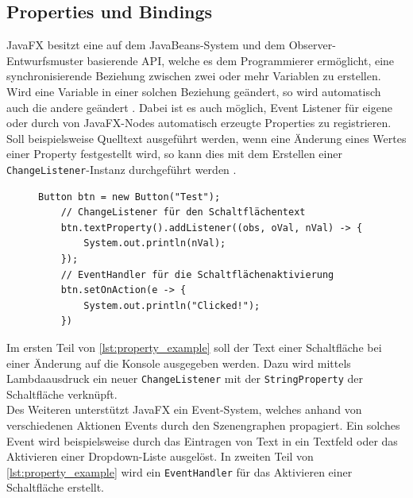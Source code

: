 \subsection{Properties und Bindings}
\label{properties_und_bindings}
JavaFX besitzt eine auf dem JavaBeans-System und dem Observer-Entwurfsmuster basierende API, welche es dem Programmierer ermöglicht, eine synchronisierende Beziehung zwischen zwei oder mehr Variablen zu erstellen. Wird eine Variable in einer solchen Beziehung geändert, so wird automatisch auch die andere geändert \cite{Hommel2013}. Dabei ist es auch möglich, Event Listener für eigene oder durch von JavaFX-Nodes automatisch erzeugte Properties zu registrieren. Soll beispielsweise Quelltext ausgeführt werden, wenn eine Änderung eines Wertes einer Property festgestellt wird, so kann dies mit dem Erstellen einer \texttt{ChangeListener}-Instanz durchgeführt werden \cite{Gao2019}. 
\begin{figure}
	\begin{lstlisting}[caption=Beispiel -- ChangeListener \& EventHandler, captionpos=b, label=lst:property_example]
	Button btn = new Button("Test");
	// ChangeListener für den Schaltflächentext
	btn.textProperty().addListener((obs, oVal, nVal) -> {
		System.out.println(nVal);
	});	
	// EventHandler für die Schaltflächenaktivierung
	btn.setOnAction(e -> {
		System.out.println("Clicked!");
	})
	\end{lstlisting}
\end{figure}
\noindent Im ersten Teil von \autoref{lst:property_example} soll der Text einer Schaltfläche bei einer Änderung auf die Konsole ausgegeben werden. Dazu wird mittels Lambdaausdruck ein neuer \texttt{ChangeListener} mit der \texttt{StringProperty} der Schaltfläche verknüpft.\\
Des Weiteren unterstützt JavaFX ein Event-System, welches anhand von verschiedenen Aktionen Events durch den Szenengraphen propagiert. Ein solches Event wird beispielsweise durch das Eintragen von Text in ein Textfeld oder das Aktivieren einer Dropdown-Liste ausgelöst. In zweiten Teil von \autoref{lst:property_example} wird ein \texttt{EventHandler} für das Aktivieren einer Schaltfläche erstellt.

